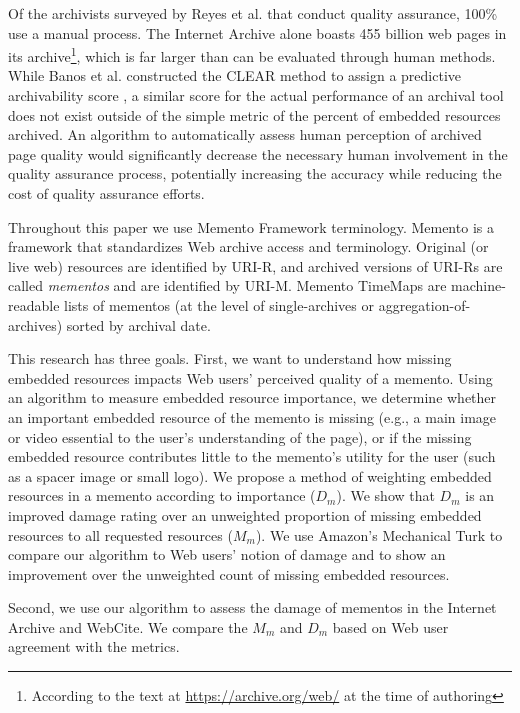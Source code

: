 Of the archivists surveyed by Reyes et al. that conduct quality assurance, 100\% use a manual process. The Internet Archive alone boasts 455 billion web pages in its archive\footnote{According to the text at \url{https://archive.org/web/} at the time of authoring}, which is far larger than can be evaluated through human methods. While Banos et al. constructed the CLEAR method to assign a predictive archivability score \cite{ipresArchivability}, a similar score for the actual performance of an archival tool does not exist outside of the simple metric of the percent of embedded resources archived. 
An algorithm to automatically assess human perception of archived page quality would significantly decrease the necessary human involvement in the quality assurance process, potentially increasing the accuracy while reducing the cost of quality assurance efforts.


Throughout this paper we use Memento Framework terminology. Memento \cite{nelson:memento:tr} is a framework that standardizes Web archive access and terminology. Original (or live web) resources are identified by URI-R, and archived versions of URI-Rs are called \emph{mementos} and are identified by URI-M. Memento TimeMaps are machine-readable lists of mementos (at the level of single-archives or aggregation-of-archives) sorted by archival date.

This research has three goals. First, we want to understand how missing embedded resources impacts Web users' perceived quality of a memento. Using an algorithm to measure embedded resource importance, we determine whether an important embedded resource of the memento is missing (e.g., a main image or video essential to the user's understanding of the page), or if the missing embedded resource contributes little to the memento's utility for the user (such as a spacer image or small logo). We propose a method of weighting embedded resources in a memento according to importance ($D_m$). We show that $D_m$ is an improved damage rating over an unweighted proportion of missing embedded resources to all requested resources ($M_m$). We use Amazon's Mechanical Turk to compare our algorithm to Web users' notion of damage and to show an improvement over the unweighted count of missing embedded resources.

Second, we use our algorithm to assess the damage of mementos in the Internet Archive and WebCite. We compare the $M_m$ and $D_m$ based on Web user agreement with the metrics. %

